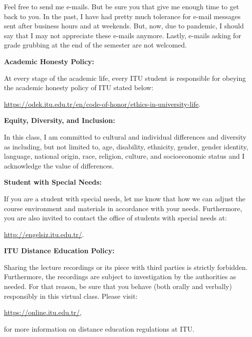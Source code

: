 \documentclass[
  12pt,
]{article}
\begin{document}
Feel free to send me e-mails. But be sure you that give me enough time
to get back to you. In the past, I have had pretty much tolerance for
e-mail messages sent after business hours and at weekends. But, now, due
to pandemic, I should say that I may not appreciate these e-mails
anymore. Lastly, e-mails asking for grade grubbing at the end of the
semester are not welcomed.

\textbf{Academic Honesty Policy:}

At every stage of the academic life, every ITU student is responsible
for obeying the academic honesty policy of ITU stated below:

\url{https://odek.itu.edu.tr/en/code-of-honor/ethics-in-university-life}.

\textbf{Equity, Diversity, and Inclusion:}

In this class, I am committed to cultural and individual differences and
diversity as including, but not limited to, age, disability, ethnicity,
gender, gender identity, language, national origin, race, religion,
culture, and socioeconomic status and I acknowledge the value of
differences.

\textbf{Student with Special Needs:}

If you are a student with special needs, let me know that how we can
adjust the course environment and materials in accordance with your
needs. Furthermore, you are also invited to contact the office of
students with special needs at:

\url{http://engelsiz.itu.edu.tr/}.

\textbf{ITU Distance Education Policy:}

Sharing the lecture recordings or its piece with third parties is
strictly forbidden. Furthermore, the recordings are subject to
investigation by the authorities as needed. For that reason, be sure
that you behave (both orally and verbally) responsibly in this virtual
class. Please visit:

\url{https://online.itu.edu.tr/},

for more information on distance education regulations at ITU.
\end{document}
